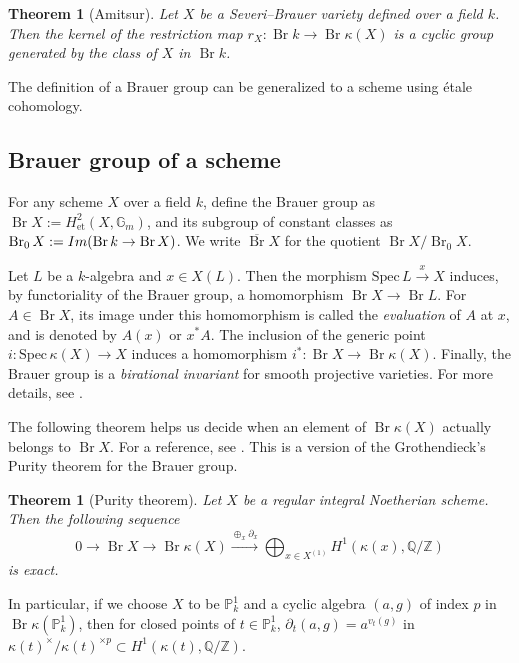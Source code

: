 \documentclass[11pt]{amsart}
\theoremstyle{plain}
\newtheorem{theorem}[thm]{Theorem}
\theoremstyle{definition}
\newcommand{\im}{{\rm Im}}
\newcommand{\G}{{\mathbb G}}
\renewcommand{\P}{{\mathbb P}}
\newcommand{\Q}{{\mathbb Q}}
\newcommand{\Z}{{\mathbb Z}}
\newcommand{\et}{\text{et}}
\DeclareMathOperator{\Br}{Br}
\begin{document}
\begin{theorem}[Amitsur]\label{Amitsur}
    Let $X$ be a Severi--Brauer variety defined over a field $k$. Then the kernel of the restriction map $r_X : \Br k \rightarrow \Br \kappa(X)$ is a cyclic group generated by the class of $X$ in $\Br k$.
\end{theorem}

The definition of a Brauer group can be generalized to a scheme using \'{e}tale cohomology.

\subsection{Brauer group of a scheme}
For any scheme $X$ over a field $k$, define the Brauer group as $\Br X:=H^2_{\et}(X,\G_m)$, and its subgroup of constant classes as $\Br_0X:=\im(\Br k\rightarrow \Br X)$. We write $\overline{\Br}X$ for the quotient $\Br X/\Br_0 X$.

Let $L$ be a $k$-algebra and $x \in X(L)$. Then the morphism $\text{Spec}\, L \xrightarrow{x} X$ induces, by functoriality of the Brauer group, a homomorphism $\Br X \to \Br L$. For $A \in \Br X$, its image under this homomorphism is called the \emph{evaluation} of $A$ at $x$, and is denoted by $A(x)$ or $x^*A$. The inclusion of the generic point $i: \text{Spec}\,\kappa(X) \to X$ induces a homomorphism $i^*: \Br X \to \Br \kappa(X)$. Finally, the Brauer group is a \emph{birational invariant} for smooth projective varieties. For more details, see \cite[§ 6.6]{poonen}.



 The following theorem helps us decide when an element of $\Br\kappa(X)$ actually belongs to $\Br X$. For a reference, see \cite[Theorem 6.8.3]{poonen}. This is a version of the Grothendieck's Purity theorem for the Brauer group.

\begin{theorem}[Purity theorem]
    Let $X$ be a regular integral Noetherian scheme. Then the following sequence 
    \begin{equation*}\label{purity1}
    0\rightarrow\Br X\rightarrow\Br \kappa(X)\xrightarrow{\oplus_x \partial_x}\displaystyle\bigoplus_{x\in X^{(1)}}H^1(\kappa(x),\Q/\Z)
	\end{equation*}
	is exact.
\end{theorem}
In particular, if we choose $X$ to be $\P^1_k$ and a cyclic algebra $(a,g)$ of index $p$ in $\Br\kappa(\P^1_k)$, then for closed points of $t\in{\P^{1}_k}$, $\partial_t(a,g)=a^{v_t(g)}$ in $\kappa(t)^{\times}/\kappa(t)^{\times p}\subset H^1(\kappa(t),\Q/\Z)$.
\end{document}
